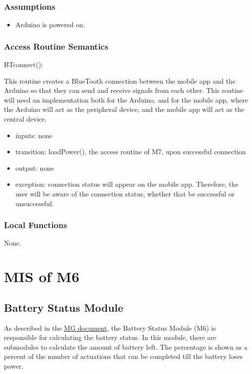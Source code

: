 \documentclass[12pt, titlepage]{article}
\begin{document}
\subsubsection{Assumptions}

\begin{itemize}
\item Arduino is powered on.
\end{itemize}

\subsubsection{Access Routine Semantics}

\noindent BTconnect():

This routine creates a BlueTooth connection between the mobile app and the Arduino so that they can send and receive signals from each other. This routine will need an implementation both for the Arduino, and for the mobile app, where the Arduino will act as the peripheral device, and the mobile app will act as the central device. 

\begin{itemize} 
\item inputs: none
\item transition: loadPower(), the access routine of M7, upon successful connection
\item output: none
\item exception: connection status will appear on the mobile app. Therefore, the user will be aware of the connection status, whether that be successful or unsuccessful. 
\end{itemize}

\subsubsection{Local Functions}

None.


\section{MIS of M6} \label{BatteryStatus} 

\subsection{Battery Status Module}

As described in the \href{https://github.com/NevoAbigail/Capstone/blob/main/docs/Design/SoftArchitecture/MG.pdf}{MG document}, the Battery Status Module (M6) is responsible for calculating the battery status. In this module, there are submodules to calculate the amount of battery left. The percentage is shown as a percent of the number of actuations that can be completed till the battery loses power. 
\end{document}
